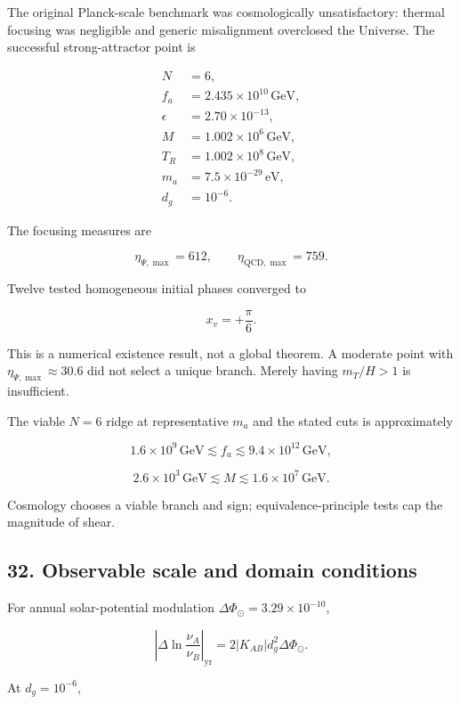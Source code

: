 \documentclass[
]{article}
\begin{document}
The original Planck-scale benchmark was cosmologically unsatisfactory:
thermal focusing was negligible and generic misalignment overclosed the
Universe. The successful strong-attractor point is

\[
\boxed{
\begin{aligned}
N&=6,\\
f_a&=2.435\times10^{10}\,\mathrm{GeV},\\
\epsilon&=2.70\times10^{-13},\\
M&=1.002\times10^6\,\mathrm{GeV},\\
T_R&=1.002\times10^8\,\mathrm{GeV},\\
m_a&=7.5\times10^{-29}\,\mathrm{eV},\\
d_g&=10^{-6}.
\end{aligned}}
\]

The focusing measures are

\[
\eta_{\Psi,\max}=612,
\qquad
\eta_{{\mathrm{QCD}},\max}=759.
\]

Twelve tested homogeneous initial phases converged to

\[
x_v=+\frac\pi6.
\]

This is a numerical existence result, not a global theorem. A moderate
point with \(\eta_{\Psi,\max}\approx30.6\) did not select a unique
branch. Merely having \(m_T/H>1\) is insufficient.

The viable \(N=6\) ridge at representative \(m_a\) and the stated cuts
is approximately

\[
1.6\times10^9\,\mathrm{GeV}
\lesssim f_a\lesssim
9.4\times10^{12}\,\mathrm{GeV},
\]

\[
2.6\times10^3\,\mathrm{GeV}
\lesssim M\lesssim
1.6\times10^7\,\mathrm{GeV}.
\]

Cosmology chooses a viable branch and sign; equivalence-principle tests
cap the magnitude of shear.

\hypertarget{observable-scale-and-domain-conditions}{%
\subsection{32. Observable scale and domain
conditions}\label{observable-scale-and-domain-conditions}}

For annual solar-potential modulation
\(\Delta\Phi_\odot=3.29\times10^{-10}\),

\[
\left|\Delta\ln\frac{\nu_A}{\nu_B}\right|_{\mathrm{yr}}
=2|K_{AB}|d_g^2\Delta\Phi_\odot.
\]

At \(d_g=10^{-6}\),
\end{document}
